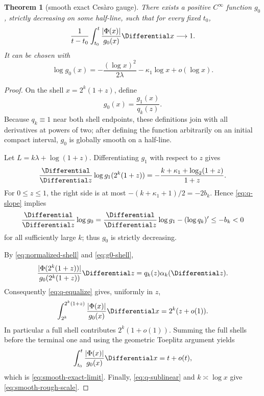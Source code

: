 \documentclass[11pt,oneside]{article}
\newtheorem{theorem}{Theorem}[section]
\theoremstyle{definition}
\theoremstyle{remark}
\begin{document}
\begin{theorem}[smooth exact Ces\`aro gauge]
\label{thm:smooth-exact}
There exists a positive \(C^\infty\) function \(g_0\), strictly decreasing on
some half-line, such that for every fixed \(t_0\),
\begin{equation}
 \frac1{t-t_0}\int_{t_0}^t\frac{|\Phi(x)|}{g_0(x)}\Differential x
 \longrightarrow1.
 \label{eq:smooth-exact-limit}
\end{equation}
It can be chosen with
\begin{equation}
 \log g_0(x)
 =-\frac{(\log x)^2}{2\lambda}-\kappa_1\log x+o(\log x).
 \label{eq:smooth-rough-scale}
\end{equation}
\end{theorem}

\begin{proof}
On the shell \(x=2^k(1+z)\), define
\begin{equation}
 g_0(x)=\frac{g_1(x)}{q_k(z)}.
 \label{eq:g0-shell}
\end{equation}
Because \(q_k\equiv1\) near both shell endpoints, these definitions join with
all derivatives at powers of two; after defining the function arbitrarily on
an initial compact interval, \(g_0\) is globally smooth on a half-line.

Let \(L=k\lambda+\log(1+z)\).  Differentiating \(g_1\) with respect to
\(z\) gives
\begin{equation}
 \frac{\Differential}{\Differential z}\log g_1(2^k(1+z))
 =-\frac{k+\kappa_1+\log_2(1+z)}{1+z}.
 \label{eq:g1-z-derivative}
\end{equation}
For \(0\le z\le1\), the right side is at most
\(-(k+\kappa_1+1)/2=-2b_k\).  Hence \eqref{eq:q-slope} implies
\[
 \frac{\Differential}{\Differential z}\log g_0
 =\frac{\Differential}{\Differential z}\log g_1-(\log q_k)'
 \le -b_k<0
\]
for all sufficiently large \(k\); thus \(g_0\) is strictly decreasing.

By \eqref{eq:normalized-shell} and \eqref{eq:g0-shell},
\[
 \frac{|\Phi(2^k(1+z))|}{g_0(2^k(1+z))}\Differential z
 =q_k(z)\alpha_k(\Differential z).
\]
Consequently \eqref{eq:q-equalize} gives, uniformly in \(z\),
\begin{equation}
 \int_{2^k}^{2^k(1+z)}\frac{|\Phi(x)|}{g_0(x)}\Differential x
 =2^k(z+o(1)).
 \label{eq:equalized-partial-shell}
\end{equation}
In particular a full shell contributes \(2^k(1+o(1))\).  Summing the full
shells before the terminal one and using the geometric Toeplitz argument yields
\[
 \int_{t_0}^{t}\frac{|\Phi(x)|}{g_0(x)}\Differential x=t+o(t),
\]
which is \eqref{eq:smooth-exact-limit}.  Finally,
\eqref{eq:q-sublinear} and \(k\asymp\log x\) give
\eqref{eq:smooth-rough-scale}.
\end{proof}
\end{document}
